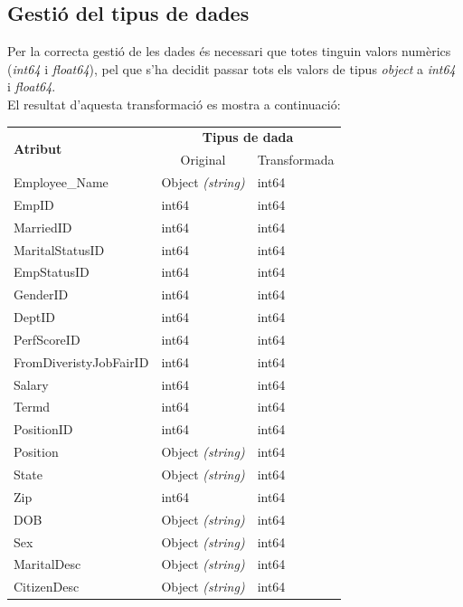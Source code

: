 \documentclass[a4paper, 11pt]{article}
\begin{document}
\subsection{Gestió del tipus de dades} \label{tipus_dades}
Per la correcta gestió de les dades és necessari que totes tinguin valors numèrics (\textit{int64} i \textit{float64}), pel que s'ha decidit passar tots els valors de tipus \textit{object} a \textit{int64} i \textit{float64}. \\
El resultat d'aquesta transformació es mostra a continuació:
\begin{table}[h]
    \centering
    \begin{tabular}{l||l|l}
        \multirow{2}{*}{\textbf{Atribut}} & \multicolumn{2}{c}{\textbf{Tipus de dada}}\\
        & \multicolumn{1}{c|}{Original} & \multicolumn{1}{c}{Transformada} \\ \hline \hline
        Employee\_Name & Object \textit{(string)} & int64 \\\hline
        EmpID &  int64 & int64 \\\hline
        MarriedID & int64 & int64 \\\hline
        MaritalStatusID & int64  & int64 \\\hline
        EmpStatusID & int64 & int64 \\\hline
        GenderID & int64 & int64  \\\hline
        DeptID & int64 & int64  \\\hline
        PerfScoreID & int64  & int64   \\\hline
        FromDiveristyJobFairID & int64 & int64 \\\hline
        Salary & int64 & int64   \\\hline
        Termd & int64 & int64\\\hline
        PositionID & int64 & int64 \\\hline
        Position & Object \textit{(string)} & int64 \\\hline
        State & Object \textit{(string)} & int64 \\\hline
        Zip & int64 & int64 \\\hline
        DOB & Object \textit{(string)} & int64 \\\hline
        Sex & Object \textit{(string)} & int64 \\\hline
        MaritalDesc & Object \textit{(string)} & int64 \\\hline
        CitizenDesc & Object \textit{(string)} & int64 \\\hline

\end{tabular}
\end{table}
\end{document}
